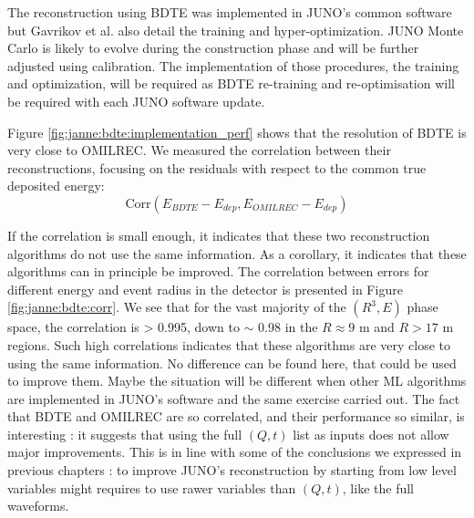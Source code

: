 \documentclass[../main.tex]{subfiles}
\begin{document}
The reconstruction using BDTE was implemented in JUNO's common software but Gavrikov et al. also detail the training and hyper-optimization. JUNO Monte Carlo is likely to evolve during the construction phase and will be further adjusted using calibration. The implementation of those procedures, the training and optimization, will be required as BDTE re-training and re-optimisation will be required with each JUNO software update.

Figure \ref{fig:janne:bdte:implementation_perf} shows that the resolution of BDTE is very close to OMILREC. We measured the correlation between their reconstructions, focusing on the residuals with respect to the common true deposited energy:
\begin{equation}
  \label{eq:janne:bdte:corr}
\mathrm{Corr}(E_{BDTE} - E_{dep}, E_{OMILREC} - E_{dep})
\end{equation}

If the correlation is small enough, it indicates that these two reconstruction algorithms do not use the same information. As a corollary, it indicates that these algorithms can in principle be improved. The correlation between errors for different energy and event radius in the detector is presented in Figure \ref{fig:janne:bdte:corr}. We see that for the vast majority of the $(R^3, E)$ phase space, the correlation is > 0.995, down to $\sim$ 0.98 in the $R \approx 9$ m and $R > 17$ m regions. Such high correlations indicates that these algorithms are very close to using the same information. No difference can be found here, that could be used to improve them. Maybe the situation will be different when other ML algorithms are implemented in JUNO's software and the same exercise carried out. The fact that  BDTE and OMILREC are so correlated, and their performance so similar, is interesting : it suggests that using the full $(Q, t)$ list as inputs does not allow major improvements. This is in line with  some of the conclusions we expressed in previous chapters : to improve  JUNO's reconstruction by starting from low level variables might requires to use rawer variables than $(Q,t)$, like the full waveforms.
\end{document}
